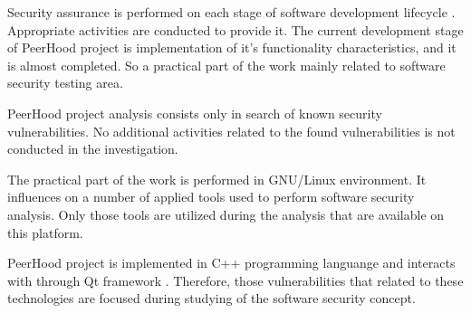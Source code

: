 %
Security assurance is performed on each stage of software development lifecycle . 
%
Appropriate activities are conducted to provide it. 
%
The current development stage of \The PeerHood project is implementation of it's functionality characteristics, and it is almost completed. 
%
So a practical part of the work mainly related to software security testing area. 

%
PeerHood project analysis consists only in search of known security vulnerabilities. 
%
No additional activities related to the found vulnerabilities is not conducted in the investigation. 

%
The practical part of the work is performed in GNU/Linux  environment. 
%
It influences on a number of applied tools used to perform software security analysis. 
%
Only those tools are utilized during the analysis that are available on this platform. 

%
\TThe PeerHood project is implemented in C++ programming languange  and interacts with  through Qt framework . 
%
Therefore, those vulnerabilities that related to these technologies are focused during studying of the software security concept. 
